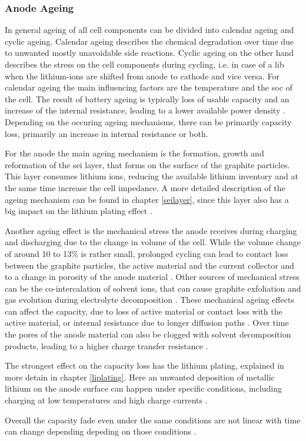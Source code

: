 \subsubsection{Anode Ageing}
In general ageing of all cell components can be divided into calendar ageing and cyclic ageing. Calendar ageing describes the chemical degradation over time due to unwanted mostly unavoidable side reactions. Cyclic ageing on the other hand describes the stress on the cell components during cycling, i.e. in case of a \gls{lib} when the lithium-ions are shifted from anode to cathode and vice versa. For calendar ageing the main influencing factors are the temperature and the \gls{soc} of the cell. The result of battery ageing is typically loss of usable capacity and an increase of the internal resistance, leading to a lower available power density \cite{Lin.2015}. Depending on the occuring ageing mechanisms, there can be primarily capacity loss, primarily an increase in internal resistance or both. \par 
For the anode the main ageing mechanism is the formation, growth and reformation of the \gls{sei} layer, that forms on the surface of the graphite particles. This layer consumes lithium ions, reducing the available lithium inventory and at the same time increase the cell impedance. A  more detailed description of the ageing mechanism can be found in chapter \ref{seilayer}, since this layer also has a big impact on the lithium plating effect \cite{Lin.2015}.\par
Another ageing effect is the mechanical stress the anode receives during charging and discharging due to the change in volume of the cell. While the volume change of around 10 to 13\% is rather small, prolonged cycling can lead to contact loss between the graphite particles, the active material and the current collector and to a change in porosity of the anode material \cite{Vetter.2005}. Other sources of mechanical stress can be the co-intercalation of solvent ions, that can cause graphite exfoliation and gas evolution during electrolyte decomposition \cite{Lin.2015}. These mechanical ageing effects can affect the capacity, due to loss of active material or contact loss with the active material, or internal resistance due to longer diffusion paths \cite{Vetter.2005}. Over time the pores of the anode material can also be clogged with solvent decomposition products, leading to a higher charge transfer resistance \cite{Agubra.2013}. \par
The strongest effect on the capacity loss has the lithium plating, explained in more detain in chapter \ref{liplating}. Here an unwanted deposition of metallic lithium on the anode surface can happen under specific conditions, including charging at low temperatures and high charge currents \cite{Vetter.2005}. \par
Overall the capacity fade even under the same conditions are not linear with time can change depending depeding on those conditions \cite{Barre.2013}. 





